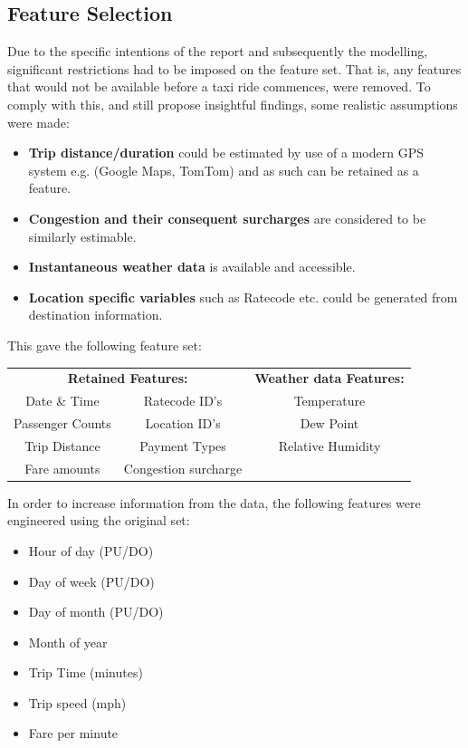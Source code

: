 \documentclass[11pt]{article}
\begin{document}
\subsection{Feature Selection}
Due to the specific intentions of the report and subsequently the modelling, significant restrictions had to be imposed on the feature set. That is, any features that would not be available before a taxi ride commences, were removed. 
To comply with this, and still propose insightful findings, some realistic assumptions were made:
\begin{itemize}
    \item \textbf{Trip distance/duration} could be estimated by use of a modern GPS system e.g. (Google Maps, TomTom) and as such can be retained as a feature.
    \item \textbf{Congestion and their consequent surcharges} are considered to be similarly estimable.
    \item \textbf{Instantaneous weather data} is available and accessible.
    \item \textbf{Location specific variables} such as Ratecode etc. could be generated from destination information.
\end{itemize}

This gave the following feature set:

\begin{table}[H]
\centering
\begin{tabular}{cccl}
\multicolumn{2}{c}{\textbf{Retained Features:}} & \multicolumn{2}{c}{\textbf{Weather data Features:}} \\
Date \& Time     & Ratecode ID’s        & \multicolumn{2}{c}{Temperature}       \\
Passenger Counts & Location ID’s        & \multicolumn{2}{c}{Dew Point}         \\
Trip Distance    & Payment Types        & \multicolumn{2}{c}{Relative Humidity} \\
Fare amounts     & Congestion surcharge & \multicolumn{2}{l}{}                 
\end{tabular}
\end{table}


In order to increase information from the data, the following features were engineered using the original set:
\begin{itemize}
    \item Hour of day (PU/DO)
    \item Day of week (PU/DO)
    \item Day of month (PU/DO)
    \item Month of year
    \item Trip Time (minutes)
    \item Trip speed (mph)
    \item Fare per minute
\end{itemize}
\end{document}
